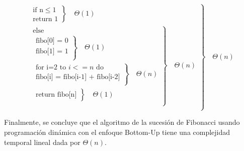     \begin{equation*}
        \left.
            \begin{aligned}
                \left.
                    \begin{aligned}
                        \text{if n}\leq1\\
                        \text{return 1}
                    \end{aligned}
                \right\}
                \quad\Theta(1)
                \\
                \left.
                    \begin{aligned}
                        \text{else}\\
                        \left.
                            \begin{aligned}
                                \text{fibo[0] = 0}\\
                                \text{fibo[1] = 1}\\
                            \end{aligned}
                        \right\}
                        \quad\Theta(1)
                        \\
                        \left.
                            \begin{aligned}
                                \text{for i=2 to } i<=n \text{ do}\\
                                \text{fibo[i] = fibo[i-1] + fibo[i-2]}\\
                            \end{aligned}
                        \right\}
                        \quad\Theta(n)
                        \\
                        \left.
                            \begin{aligned}
                                \text{return fibo[n]}
                            \end{aligned}
                        \right\}
                        \quad\Theta(1)
                        \\
                    \end{aligned}
                \right\}
                \quad\Theta(n)
                \\
            \end{aligned}
        \right\}
        \quad\Theta(n)
    \end{equation*} 

    Finalmente, se concluye que el algoritmo de la sucesión de Fibonacci usando programación dinámica con el enfoque Bottom-Up tiene una complejidad temporal lineal dada por $\Theta(n)$.